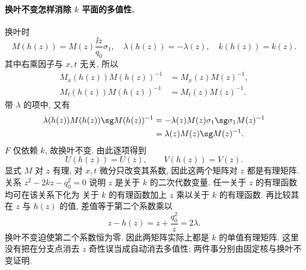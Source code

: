 \paragraph{换叶不变怎样消除 $k$ 平面的多值性.}
换叶时
\[
M(h(z))=M(z)\dfrac{\ii z}{q_0}\sigma_1,
\quad \lambda(h(z))=-\lambda(z),
\quad k(h(z))=k(z).
\]
其中右乘因子与 $x,t$ 无关, 所以
\[
\begin{aligned}
M_x(h(z))M(h(z))^{-1}&=M_x(z)M(z)^{-1},\\
M_t(h(z))M(h(z))^{-1}&=M_t(z)M(z)^{-1}.
\end{aligned}
\]
带 $\lambda$ 的项中, 又有
\[
\begin{aligned}
\lambda(h(z))M(h(z))\sg M(h(z))^{-1}
&=-\lambda(z)M(z)\sigma_1\sg\sigma_1M(z)^{-1}\\
&=\lambda(z)M(z)\sg M(z)^{-1}.
\end{aligned}
\]
$F$ 仅依赖 $k$, 故换叶不变.
由此逐项得到
\[
 U(h(z))= U(z),\qquad
 V(h(z))= V(z).
\]
显式 $M$ 对 $z$ 有理, 对 $x,t$ 微分只改变其系数,
因此这两个矩阵对 $z$ 都是有理矩阵.
关系 $z^2-2kz-q_0^2=0$ 说明 $z$ 是关于 $k$ 的二次代数变量.
任一关于 $z$ 的有理函数均可在该关系下化为
关于 $k$ 的有理函数加上 $z$ 乘以关于 $k$ 的有理函数.
再比较其在 $z$ 与 $h(z)$ 的值,
差值等于第二个系数乘以
\[
z-h(z)=z+\dfrac{q_0^2}{z}=2\lambda.
\]
换叶不变迫使第二个系数恒为零.
因此两矩阵实际上都是 $k$ 的单值有理矩阵.
这里没有把在分支点消去 $z$ 奇性误当成自动消去多值性;
两件事分别由固定核与换叶不变证明.

